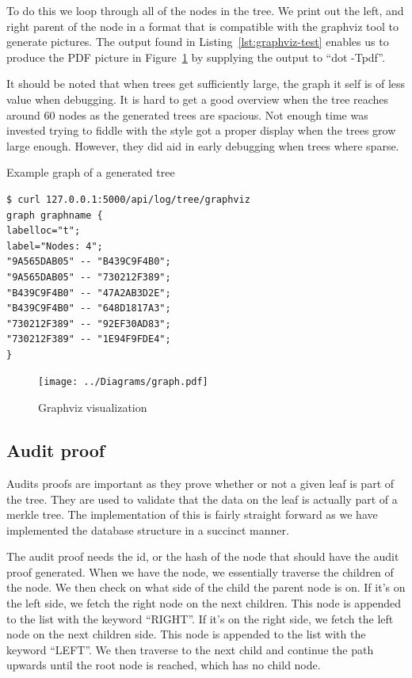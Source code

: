 \documentclass[../Main/thesis.tex]{subfiles}
\begin{document}
To do this we loop through all of the nodes in the tree. We print out the left,
and right parent of the node in a format that is compatible with the graphviz
tool to generate pictures. The output found in Listing~\ref{lst:graphviz-test}
enables us to produce the PDF picture in Figure~\ref{fig:graphviz_pdf} by
supplying the output to ``dot -Tpdf''.

It should be noted that when trees get sufficiently large, the graph it self is
of less value when debugging. It is hard to get a good overview when the tree
reaches around 60 nodes as the generated trees are spacious. Not enough time was
invested trying to fiddle with the style got a proper display when the trees
grow large enough. However, they did aid in early debugging when trees where
sparse.

\begin{listing}[H]
\caption{Example graph of a generated tree}
\label{lst:graphviz-test}
\begin{verbatim}
$ curl 127.0.0.1:5000/api/log/tree/graphviz                        
graph graphname {
labelloc="t";
label="Nodes: 4";
"9A565DAB05" -- "B439C9F4B0";
"9A565DAB05" -- "730212F389";
"B439C9F4B0" -- "47A2AB3D2E";
"B439C9F4B0" -- "648D1817A3";
"730212F389" -- "92EF30AD83";
"730212F389" -- "1E94F9FDE4";
}
\end{verbatim}
\end{listing}

\begin{figure}[H]
\centering
\texttt{[image: ../Diagrams/graph.pdf]}
\caption{Graphviz visualization}
\label{fig:graphviz_pdf}
\end{figure}


\subsection*{Audit proof}%
\label{sub:audit_proof_implementation}
Audits proofs are important as they prove whether or not a given leaf is part of
the tree. They are used to validate that the data on the leaf is actually part
of a merkle tree. The implementation of this is fairly straight forward as we
have implemented the database structure in a succinct manner.

The audit proof needs the id, or the hash of the node that should have the audit
proof generated. When we have the node, we essentially traverse the children of
the node. We then check on what side of the child the parent node is on. If it's
on the left side, we fetch the right node on the next children. This node is
appended to the list with the keyword ``RIGHT''. If it's on the right side, we
fetch the left node on the next children side. This node is appended to the list
with the keyword ``LEFT''. We then traverse to the next child and continue the
path upwards until the root node is reached, which has no child node.
\end{document}
